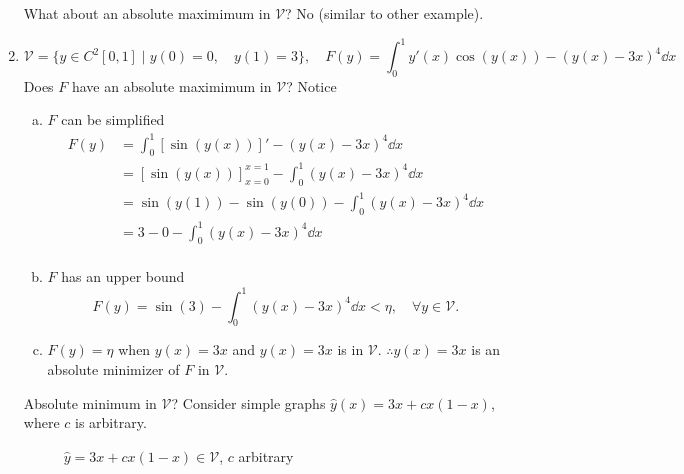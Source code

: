 \documentclass[12pt,twoside]{article}
\begin{document}
\begin{enumerate}
  What about an absolute maximimum in $\mathcal{V}$? No (similar to other
  example).
\item
  \begin{equation*}
    \mathcal{V} = \{y\in C^2[0,1] \;|\; y(0)=0,\quad y(1)=3\},\quad
    F(y)=\int_0^1y'(x)\cos(y(x))-{(y(x)-3x)}^4\dd{x}
  \end{equation*}
  Does $F$ have an absolute maximimum in $\mathcal{V}$? Notice
  \begin{enumerate}[(a)]
  \item $F$ can be simplified
    \begin{align*}
      F(y) &= \int_0^1[\sin(y(x))]'-{(y(x)-3x)}^4 \dd{x} \\
           &= [\sin(y(x))]_{x=0}^{x=1} - \int_0^1{(y(x)-3x)}^4\dd{x} \\
           &= \sin(y(1)) - \sin(y(0)) - \int_0^1{(y(x)-3x)}^4\dd{x} \\
           &= 3 - 0 - \int_0^1{(y(x)-3x)}^4\dd{x} \\
    \end{align*}
  \item $F$ has an upper bound
    \begin{equation*}
      F(y)=\sin(3) - \int_0^1{(y(x)-3x)}^4\dd{x} < \eta,\quad \forall y\in\mathcal{V}.
    \end{equation*}
  \item $F(y)=\eta$ when $y(x)=3x$ and $y(x)=3x$ is in $\mathcal{V}$.
    $\therefore y(x)=3x$ is an absolute minimizer of $F$ in $\mathcal{V}$.
  \end{enumerate}
  Absolute minimum in $\mathcal{V}$? Consider simple graphs
  $\hat{y}(x)=3x+cx(1-x)$, where $c$ is arbitrary.
  \begin{figure}[ht]
    \centering
    \caption{$\hat{y}=3x+cx(1-x)\in\mathcal{V}$, $c$ arbitrary}
    \label{fig:v-equation-4}

\end{figure}
\end{enumerate}
\end{document}
